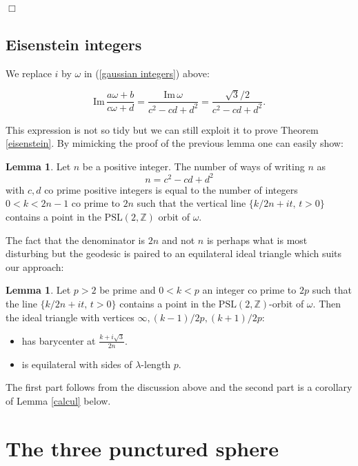 \documentclass[12pt]{amsart}
\theoremstyle{plain}
\theoremstyle{definition}
\newtheorem{lem}[thm]{Lemma}
\def\im{\mathrm{Im}\,}
\def\ZZ{\mathbb{Z}}
\def\sl2{\mathrm{PSL}(2, \ZZ)}
\begin{document}
\hfill $\Box$

\subsection{Eisenstein integers}

We replace $i$ by $\omega$ in (\ref{gaussian integers}) above:

\begin{equation}
\label{eisen  integers}
 \im  \frac{a \omega +b}{c \omega+d }
= \frac{\im \omega} {c^2  - cd  + d^2} 
= \frac{\sqrt{3}/2} {c^2  - cd  + d^2}.
\end{equation}

This expression is not so tidy but we can still exploit it 
to prove Theorem \ref{eisenstein}. 
By mimicking the proof of the previous lemma 
one can easily show:


\begin{lem} \label{cubes}
Let $n$ be a positive integer.
The number of  ways of writing $n$  as 
$$n = c^2  - cd  + d^2$$
with $c,d$ co prime positive  integers
is equal to the number of  integers $0 < k < 2n-1$ co prime to $2n$
such that the vertical line
$\{  k/2n + i t,\, t >0 \}$
contains  a point in the $\sl2$  orbit of $\omega$.
\end{lem}

The fact that the denominator is $2n$ and not $n$ 
is perhaps what is most disturbing but
 the geodesic is paired to an equilateral ideal triangle
which suits our approach:

\begin{lem} \label{cubes}
Let $p>2$ be prime and $0 < k < p$ an integer 
co prime to $2p$ such that the line $\{  k/2n + i t,\, t >0 \}$
contains  a point in the $\sl2$-orbit of $\omega$.
Then the ideal triangle 
with vertices $\infty, (k-1)/2p, (k+1)/2p$:
\begin{itemize}
\item has barycenter at $\frac{ k + i \sqrt{3}}{2n}$.
\item is equilateral  with sides of $\lambda$-length $p$.
\end{itemize}
\end{lem}

The  first part follows from the discussion above and the
second part is a corollary of  Lemma \ref{calcul} below. 



\section{The three punctured sphere}
\end{document}
